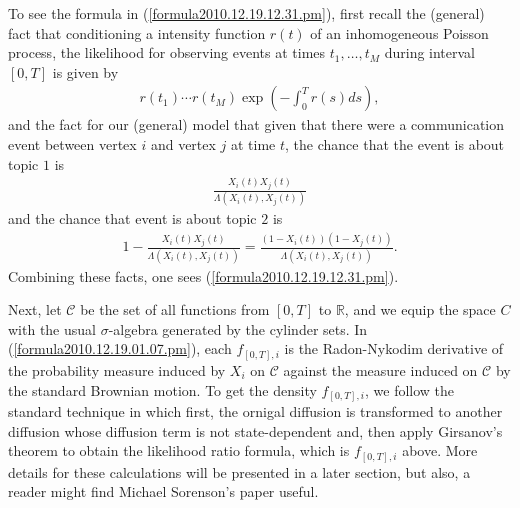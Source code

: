 \documentclass[12pt]{article}%
\begin{document}
To see the formula in (\ref{formula2010.12.19.12.31.pm}), first recall the (general) fact that 
conditioning a intensity function $r(t)$ of an inhomogeneous Poisson process,
the likelihood for observing events at times $t_1,\ldots, t_M$ during interval $[0,T]$
is given by
\begin{eqnarray}
r(t_1)\cdots r(t_M) \exp\left(-\int_0^{T} r(s) ds\right),
\end{eqnarray}
and the fact for our (general) model that 
given that there were a communication event between vertex $i$ and vertex $j$ at time $t$,
the chance that the event is about topic $1$ is 
\begin{eqnarray}
\frac{X_i(t)X_j(t)}{\Lambda(X_i(t),X_j(t))} 
\end{eqnarray}
and the chance that event is about topic $2$ is 
\begin{eqnarray}
1-\frac{X_i(t)X_j(t)}{\Lambda(X_i(t),X_j(t))} 
=
\frac{(1-X_i(t))(1-X_j(t))}{\Lambda(X_i(t),X_j(t))}.
\end{eqnarray}
Combining these facts, one sees (\ref{formula2010.12.19.12.31.pm}). 

Next, let $\mathcal C$ be the set of all functions from $[0,T]$ to $\mathbb R$, and 
we equip the space $C$ with the usual $\sigma$-algebra generated by the cylinder sets. 
In (\ref{formula2010.12.19.01.07.pm}), 
each $f_{[0,T],i}$ is the Radon-Nykodim derivative of the probability measure induced by $X_i$ 
on $\mathcal C$ against the measure induced on $\mathcal C$ by the standard Brownian motion. 
To get the density $f_{[0,T],i}$, we follow the standard technique in which 
first, the ornigal diffusion is transformed to another diffusion whose
diffusion term is not state-dependent and, then apply Girsanov's theorem to obtain
the likelihood ratio formula, which is $f_{[0,T],i}$ above.  More details for these calculations 
will be presented in a later section, but also, a reader might find Michael Sorenson's 
paper useful. 
\end{document}
